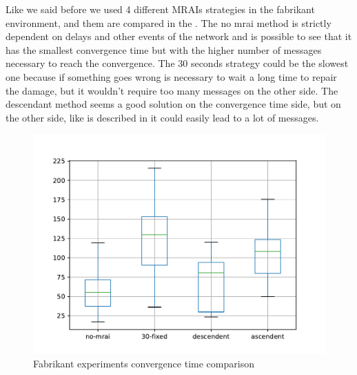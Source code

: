 \documentclass[10pt,conference,letterpaper]{IEEEtran}
\newcommand{\figwidth}{0.78}
\newcommand{\figvspace}{-1.5em}
\begin{document}
Like we said before we used 4 different \ac{MRAI}s strategies in the fabrikant
environment, and them are compared in the .
The no mrai method is strictly dependent on delays and other events of the network
and is possible to see that it has the smallest convergence time but with the higher
number of messages necessary to reach the convergence.
The \num{30} seconds strategy could be the slowest one because if something goes
wrong is necessary to wait a long time to repair the damage, but it wouldn't
require too many messages on the other side.
The descendant method seems a good solution on the convergence time side, but
on the other side, like is described in \cite{fabrikant} it could easily lead
to a lot of messages.

\begin{figure}[tb]
	\centering
	\includegraphics[width=\figwidth\columnwidth]{images/fabrikant/convergence_time}
	\caption{Fabrikant experiments convergence time comparison}
	\label{fig:fabr_conv_time_comp}
	\vspace{\figvspace}
\end{figure}
\end{document}
